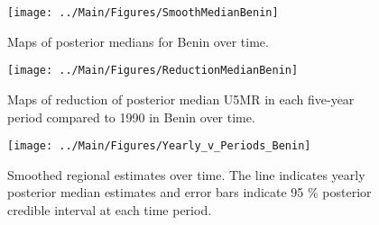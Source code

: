\documentclass[12pt]{article}\usepackage[]{graphicx}\usepackage[]{color}
\newenvironment{knitrout}{}{} %
\begin{document}
\begin{knitrout}
\color{fgcolor}\begin{figure}[bht]

{\centering \texttt{[image: ../Main/Figures/SmoothMedianBenin]} 

}

\caption[Maps of posterior medians for Benin  over time]{Maps of posterior medians for Benin  over time.}\label{fig:unnamed-chunk-14}
\end{figure}


\end{knitrout}
\begin{knitrout}
\color{fgcolor}\begin{figure}[bht]

{\centering \texttt{[image: ../Main/Figures/ReductionMedianBenin]} 

}

\caption[Maps of reduction of posterior median U5MR in each five-year period compared to 1990 in Benin over time]{Maps of reduction of posterior median U5MR in each five-year period compared to 1990 in Benin over time.}\label{fig:unnamed-chunk-15}
\end{figure}


\end{knitrout}
\begin{knitrout}
\color{fgcolor}\begin{figure}[bht]

{\centering \texttt{[image: ../Main/Figures/Yearly\_v\_Periods\_Benin]} 

}

\caption[Smoothed regional estimates over time]{Smoothed regional estimates over time. The line indicates yearly posterior median estimates and error bars indicate 95 \% posterior credible interval at each time period.}\label{fig:unnamed-chunk-16}
\end{figure}


\end{knitrout}
\end{document}
